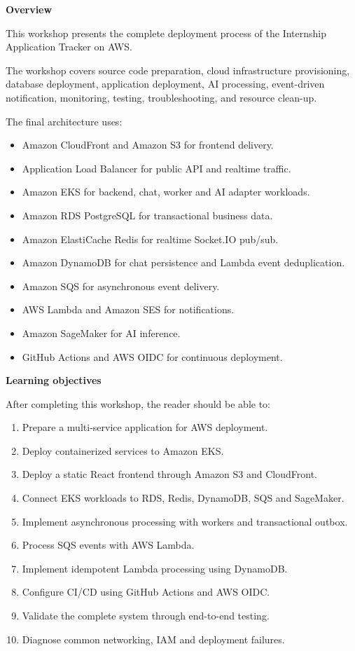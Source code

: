 \vspace{0.5em}\noindent\textbf{Overview}\par

This workshop presents the complete deployment process of the Internship
Application Tracker on AWS.

The workshop covers source code preparation, cloud infrastructure
provisioning, database deployment, application deployment, AI
processing, event-driven notification, monitoring, testing,
troubleshooting, and resource clean-up.

The final architecture uses:

\begin{itemize}
\tightlist
\item
  Amazon CloudFront and Amazon S3 for frontend delivery.
\item
  Application Load Balancer for public API and realtime traffic.
\item
  Amazon EKS for backend, chat, worker and AI adapter workloads.
\item
  Amazon RDS PostgreSQL for transactional business data.
\item
  Amazon ElastiCache Redis for realtime Socket.IO pub/sub.
\item
  Amazon DynamoDB for chat persistence and Lambda event deduplication.
\item
  Amazon SQS for asynchronous event delivery.
\item
  AWS Lambda and Amazon SES for notifications.
\item
  Amazon SageMaker for AI inference.
\item
  GitHub Actions and AWS OIDC for continuous deployment.
\end{itemize}

\vspace{0.5em}\noindent\textbf{Learning objectives}\par

After completing this workshop, the reader should be able to:

\begin{enumerate}
\def\labelenumi{\arabic{enumi}.}
\tightlist
\item
  Prepare a multi-service application for AWS deployment.
\item
  Deploy containerized services to Amazon EKS.
\item
  Deploy a static React frontend through Amazon S3 and CloudFront.
\item
  Connect EKS workloads to RDS, Redis, DynamoDB, SQS and SageMaker.
\item
  Implement asynchronous processing with workers and transactional
  outbox.
\item
  Process SQS events with AWS Lambda.
\item
  Implement idempotent Lambda processing using DynamoDB.
\item
  Configure CI/CD using GitHub Actions and AWS OIDC.
\item
  Validate the complete system through end-to-end testing.
\item
  Diagnose common networking, IAM and deployment failures.
\end{enumerate}

